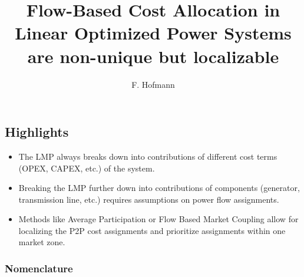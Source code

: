 \documentclass[11pt,twocolumn]{article}
\begin{document}
\title{Flow-Based Cost Allocation in Linear Optimized Power Systems are non-unique but localizable}
\author{F. Hofmann}

\maketitle

\begin{abstract}
\end{abstract}


\subsection*{Highlights}
\begin{itemize}
 \item The LMP always breaks down into contributions of different cost terms (OPEX, CAPEX, etc.) of the system.
 \item Breaking the LMP further down into contributions of components (generator, transmission line, etc.) requires assumptions on power flow assignments.
 \item Methods like Average Participation or Flow Based Market Coupling allow for localizing the P2P cost assignments and prioritize assignments within one market zone.
\end{itemize}





\subsubsection*{Nomenclature}
\end{document}
